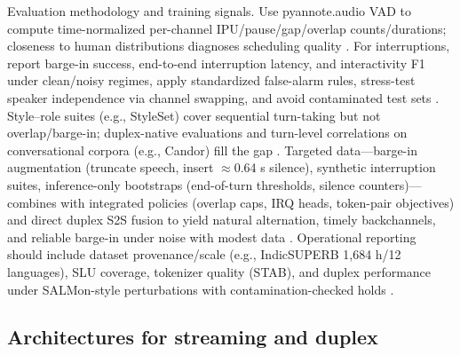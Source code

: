 \documentclass{article}
\begin{document}
Evaluation methodology and training signals. Use pyannote.audio VAD to compute time-normalized per-channel IPU/pause/gap/overlap counts/durations; closeness to human distributions diagnoses scheduling quality \cite{lu2025slideintegratingspeechlanguagemodelllmsp}. For interruptions, report barge-in success, end-to-end interruption latency, and interactivity F1 under clean/noisy regimes, apply standardized false-alarm rules, stress-test speaker independence via channel swapping, and avoid contaminated test sets \cite{maimon2025salmonsuiteacousticlanguagemodelevaluati,tseng2025evaluationllmsspeechisoftenflawedtestset,wang2025ntppgenerativespeechlanguagemodelingdual}. Style--role suites (e.g., StyleSet) cover sequential turn-taking but not overlap/barge-in; duplex-native evaluations and turn-level correlations on conversational corpora (e.g., Candor) fill the gap \cite{chiang2025audioawarelargelanguagemodelsasjudgesspe,cui2025thinkbeforeyoutalkenhancingmeaningfuldia}. Targeted data---barge-in augmentation (truncate speech, insert $\approx$0.64 s silence), synthetic interruption suites, inference-only bootstraps (end-of-turn thresholds, silence counters)---combines with integrated policies (overlap caps, IRQ heads, token-pair objectives) and direct duplex S2S fusion to yield natural alternation, timely backchannels, and reliable barge-in under noise with modest data \cite{hu2025salmduplexefficientdirectmodelingspeechl,wang2023slmbridgethingapbetweenspeechtextfoundat,wang2025dualspeechlmtowardsunifiedspeechundersta}. Operational reporting should include dataset provenance/scale (e.g., IndicSUPERB 1,684 h/12 languages), SLU coverage, tokenizer quality (STAB), and duplex performance under SALMon-style perturbations with contamination-checked holds \cite{entry2025indicsuperbspeechprocessinguniversalperf,vashishth2024stabspeechtokenizerassessmentbenchmark,maimon2025salmonsuiteacousticlanguagemodelevaluati,yang2024buildingtaiwanesemandarinspokenlanguagem}.



\subsection{Architectures for streaming and duplex} \label{subsec:Architectures for streaming and duplex}
\end{document}
